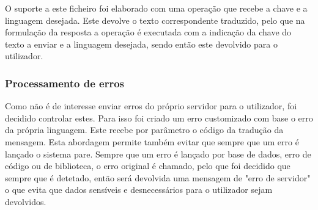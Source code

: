 O suporte a este ficheiro foi elaborado com uma operação que recebe a chave e a linguagem desejada. Este devolve o texto correspondente traduzido, pelo que na formulação da resposta a operação é executada com a indicação da chave do texto a enviar e a linguagem desejada, sendo então este devolvido para o utilizador.

\subsubsection{Processamento de erros}
Como não é de interesse enviar erros do próprio servidor para o utilizador, foi decidido controlar estes. Para isso foi criado um erro customizado com base o erro da própria linguagem. Este recebe por parâmetro o código da tradução da mensagem. Esta abordagem permite também evitar que sempre que um erro é lançado o sistema pare. Sempre que um erro é lançado por base de dados, erro de código ou de biblioteca, o erro original é chamado, pelo que foi decidido que sempre que é detetado, então será devolvida uma mensagem de "erro de servidor" o que evita que dados sensíveis e desnecessários para o utilizador sejam devolvidos.